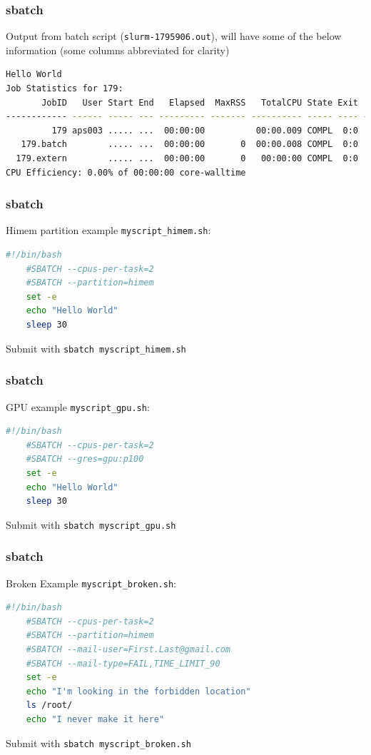 \documentclass{beamer}
\newcommand{\code}[1]{\colorbox{codegray}{\texttt{#1}}}
\begin{document}
\begin{frame}[fragile]
\frametitle{sbatch}
Output from batch script (\code{slurm-1795906.out}), will have some of the below information (some columns abbreviated for clarity)
\begingroup
\tiny
\begin{lstlisting}[backgroundcolor = \color{codegray}, language = Bash, showstringspaces=false]
Hello World
Job Statistics for 179:
       JobID   User Start End   Elapsed  MaxRSS   TotalCPU State Exit  NodeList ReqTRES
------------ ------ ----- --- --------- ------- ---------- ----- ---- --------- ----------------
         179 aps003 ..... ...  00:00:00          00:00.009 COMPL  0:0    node01  cpu=1,mem=6144M
   179.batch        ..... ...  00:00:00       0  00:00.008 COMPL  0:0    node01
  179.extern        ..... ...  00:00:00       0   00:00:00 COMPL  0:0    node01
CPU Efficiency: 0.00% of 00:00:00 core-walltime
\end{lstlisting}
\endgroup
\end{frame}


\begin{frame}[fragile]
\frametitle{sbatch}
Himem partition example \code{myscript\_himem.sh}: 
\begin{lstlisting}[backgroundcolor = \color{codegray}, language = Bash, showstringspaces=false]
    #!/bin/bash
    #SBATCH --cpus-per-task=2
    #SBATCH --partition=himem
    set -e
    echo "Hello World"
    sleep 30
\end{lstlisting}
\bigskip
\bigskip
Submit with \code{sbatch myscript\_himem.sh}
\end{frame}


\begin{frame}[fragile]
\frametitle{sbatch}
GPU example \code{myscript\_gpu.sh}: 
\begin{lstlisting}[backgroundcolor = \color{codegray}, language = Bash, showstringspaces=false]
    #!/bin/bash
    #SBATCH --cpus-per-task=2
    #SBATCH --gres=gpu:p100
    set -e
    echo "Hello World"
    sleep 30
\end{lstlisting}
\bigskip
\bigskip
Submit with \code{sbatch myscript\_gpu.sh}
\end{frame}



\begin{frame}[fragile]
\frametitle{sbatch}
Broken Example \code{myscript\_broken.sh}: 
\begin{lstlisting}[backgroundcolor = \color{codegray}, language = Bash,showstringspaces=false]
    #!/bin/bash
    #SBATCH --cpus-per-task=2
    #SBATCH --partition=himem
    #SBATCH --mail-user=First.Last@gmail.com
    #SBATCH --mail-type=FAIL,TIME_LIMIT_90
    set -e
    echo "I'm looking in the forbidden location"
    ls /root/
    echo "I never make it here"
\end{lstlisting}
\bigskip
\bigskip
Submit with \code{sbatch myscript\_broken.sh}
\end{frame}
\end{document}
